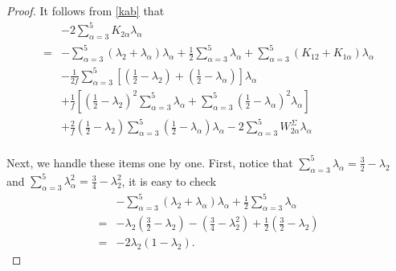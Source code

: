 \documentclass[12pt]{amsart}
\begin{document}
\begin{proof}
It follows from \eqref{kab} that
\begin{equation*}
	\begin{aligned}
		&-2\sum_{\alpha=3}^5K_{2\alpha}\lambda_\alpha\\
		 =&-\sum_{\alpha=3}^5(\lambda_{2}+\lambda_{\alpha})\lambda_\alpha+\frac{1}{2}\sum_{\alpha=3}^5\lambda_\alpha+\sum_{\alpha=3}^5(K_{12}+K_{1\alpha })\lambda_\alpha\\
		&-{\frac{1}{2f}}\sum_{\alpha=3}^5\left[ ({\frac{1}{2}}-\lambda_{2})+({\frac{1}{2}}-\lambda_{\alpha})\right] \lambda_\alpha\\
		&+\frac{1}{f}\left[({\frac{1}{2}}-\lambda_{2})^2\sum_{\alpha=3}^5\lambda_{\alpha}+ \sum_{\alpha=3}^5({\frac{1}{2}}-\lambda_{\alpha})^2 \lambda_{\alpha}\right]\\
		&+\frac{2}{f}({\frac{1}{2}}-\lambda_{2})\sum_{\alpha=3}^5({\frac{1}{2}}-\lambda_{\alpha})\lambda_{\alpha}
		-2\sum_{\alpha=3}^5W^{\Sigma}_{2\alpha}\lambda_{\alpha}\\
	\end{aligned}
\end{equation*}

Next, we handle these items one by one. First, notice that $\sum_{\alpha=3}^5\lambda_\alpha=\frac{3}{2}-\lambda_2$ and $\sum_{\alpha=3}^5\lambda_\alpha^2=\frac{3}{4}-\lambda_2^2$, it is easy to check
\begin{equation*}
	\begin{aligned}
		&-\sum_{\alpha=3}^5(\lambda_{2}+\lambda_{\alpha})\lambda_\alpha+\frac{1}{2}\sum_{\alpha=3}^5\lambda_\alpha\\
		=&-\lambda_{2}(\frac{3}{2}-\lambda_{2})-(\frac{3}{4}-\lambda_{2}^2)+\frac{1}{2}(\frac{3}{2}-\lambda_{2})\\
		=&-2\lambda_{2}(1-\lambda_{2}).
	\end{aligned}
\end{equation*}


\end{proof}
\end{document}
